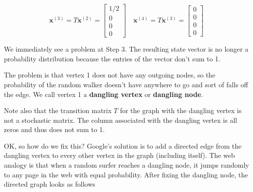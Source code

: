 \documentclass[12pt]{article}
\newcommand{\iter}[1]{^{\myp{#1}}}
\newcommand{\nin}{\noindent}
\newcommand{\vthree}{\vspace{3mm}}
\newcommand{\myp}[1]{\left( #1 \right)}
\newcommand{\mymat}[1]{
\left[
\begin{array}{rrrrrrrrrrrrrrrrrrrrrrrrrrrrrrrrrrrrrrr}
#1
\end{array}
\right]
}
\newcommand{\bx}{\mathbf{x}}
\begin{document}
\vthree

\[
 \bx\iter{3} = T\bx\iter{2} = \mymat{1/2 \\ 0 \\ 0 \\ 0}
 \quad
 \bx\iter{4} = T\bx\iter{3} = \mymat{0 \\ 0 \\ 0 \\ 0}
\]

\clearpage

\nin We immediately see a problem at Step 3.  The resulting state vector is no longer a probability distribution because the entries of the vector don't sum to 1.

\vthree

\nin The problem is that vertex 1 does not have any outgoing nodes, so the probability of the random walker doesn't have anywhere to go and sort of falls off the edge. We call vertex 1 a {\bf dangling vertex} or {\bf dangling node}.

\vthree

\nin Note also that the transition matrix $T$ for the graph with the dangling vertex is not a stochastic matrix.  The column associated with the dangling vertex is all zeros and thus does not sum to 1.

\vthree

\nin OK, so how do we fix this?  Google's solution is to add a directed edge from the dangling vertex to every other vertex in the graph (including itself).  The web analogy is that when a random surfer reaches a dangling node, it jumps randomly to any page in the web with equal probability.  After fixing the dangling node, the directed graph looks as follows

\begin{center}
\end{center}
\end{document}
